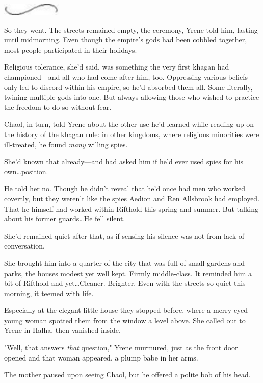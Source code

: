 \begin{center}
	\includegraphics[width=1.12in,height=0.24in]{images/seperator}
\end{center}

So they went.
The streets remained empty, the ceremony, Yrene told him, lasting until midmorning.
Even though the empire's gods had been cobbled together, most people participated in their holidays.

Religious tolerance, she'd said, was something the very first khagan had championed---and all who had come after him, too.
Oppressing various beliefs only led to discord within his empire, so he'd absorbed them all.
Some literally, twining multiple gods into one.
But always allowing those who wished to practice the freedom to do so without fear.

Chaol, in turn, told Yrene about the other use he'd learned while reading up on the history of the khagan rule: in other kingdoms, where religious minorities were ill-treated, he found \emph{many} willing spies.

She'd known that already---and had asked him if he'd ever used spies for his own\ldots position.

He told her no.
Though he didn't reveal that he'd once had men who worked covertly, but they weren't like the spies Aedion and Ren Allsbrook had employed.
That he himself had worked within Rifthold this spring and summer.
But talking about his former guards\ldots He fell silent.

She'd remained quiet after that, as if sensing his silence was not from lack of conversation.

She brought him into a quarter of the city that was full of small gardens and parks, the houses modest yet well kept.
Firmly middle-class.
It reminded him a bit of Rifthold and yet\ldots Cleaner.
Brighter.
Even with the streets so quiet this morning, it teemed with life.

Especially at the elegant little house they stopped before, where a merry-eyed young woman spotted them from the window a level above.
She called out to Yrene in Halha, then vanished inside.

"Well, that answers \emph{that} question," Yrene murmured, just as the front door opened and that woman appeared, a plump babe in her arms.

The mother paused upon seeing Chaol, but he offered a polite bob of his head.

